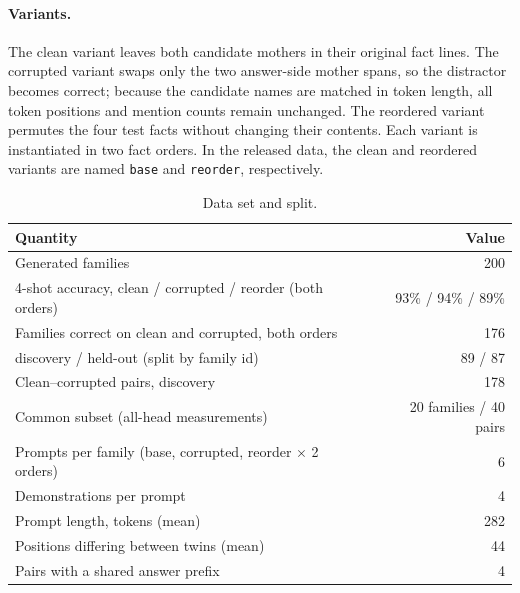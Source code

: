 \paragraph{Variants.}
The clean variant leaves both candidate mothers in their original fact lines.
The corrupted variant swaps only the two answer-side mother spans, so the
distractor becomes correct; because the candidate names are matched in token
length, all token positions and mention counts remain unchanged. The reordered
variant permutes the four test facts without changing their contents. Each
variant is instantiated in two fact orders. In the released data, the clean and
reordered variants are named \texttt{base} and \texttt{reorder}, respectively.

\begin{table}[h]
\centering\scriptsize
\begin{tabular}{@{}lr@{}}
\toprule
Quantity & Value \\
\midrule
Generated families & 200 \\
4-shot accuracy, clean / corrupted / reorder (both orders) & 93\% / 94\% / 89\% \\
Families correct on clean and corrupted, both orders & 176 \\
\quad discovery / held-out (split by family id) & 89 / 87 \\
Clean--corrupted pairs, discovery & 178 \\
Common subset (all-head measurements) & 20 families / 40 pairs \\
Prompts per family (base, corrupted, reorder $\times$ 2 orders) & 6 \\
Demonstrations per prompt & 4 \\
Prompt length, tokens (mean) & 282 \\
Positions differing between twins (mean) & 44 \\
Pairs with a shared answer prefix & 4 \\
\bottomrule
\end{tabular}
\caption{Data set and split.}
\label{tab:data}
\end{table}
